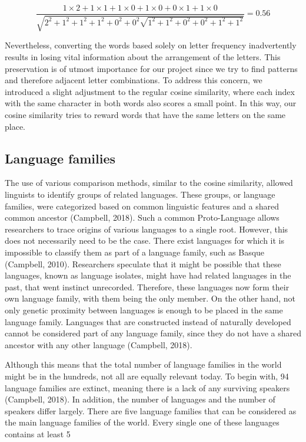 {\footnotesize
	\[
	\frac{1 \times 2 + 1 \times 1 + 1 \times 0 + 1 \times 0 + 0 \times 1 + 1 \times 0}{\sqrt{2^2 + 1^2 + 1^2 + 1^2 + 0^2 + 0^2 \sqrt{1^2 + 1^2 + 0^2 + 0^2 + 1^2 + 1^2}}} = 0.56
\]
}

Nevertheless, converting the words based solely on letter frequency inadvertently results in losing vital information about the arrangement of the letters. This preservation is of utmost importance for our project since we try to find patterns and therefore adjacent letter combinations. To address this concern, we introduced a slight adjustment to the regular cosine similarity, where each index with the same character in both words also scores a small point. In this way, our cosine similarity tries to reward words that have the same letters on the same place.

\subsection{Language families}

The use of various comparison methods, similar to the cosine similarity, allowed linguists to identify groups of related languages. These groups, or language families, were categorized based on common linguistic features and a shared common ancestor (Campbell, 2018). Such a common Proto-Language allows researchers to trace origins of various languages to a single root. However, this does not necessarily need to be the case. There exist languages for which it is impossible to classify them as part of a language family, such as Basque (Campbell, 2010). Researchers speculate that it might be possible that these languages, known as language isolates, might have had related languages in the past, that went instinct unrecorded. Therefore, these languages now form their own language family, with them being the only member. On the other hand, not only genetic proximity between languages is enough to be placed in the same language family. Languages that are constructed instead of naturally developed cannot be considered part of any language family, since they do not have a shared ancestor with any other language (Campbell, 2018). 

Although this means that the total number of language families in the world might be in the hundreds, not all are equally relevant today. To begin with, 94 language families are extinct, meaning there is a lack of any surviving speakers (Campbell, 2018). In addition, the number of languages and the number of speakers differ largely. There are five language families that can be considered as the main language families of the world. Every single one of these languages contains at least 5%

